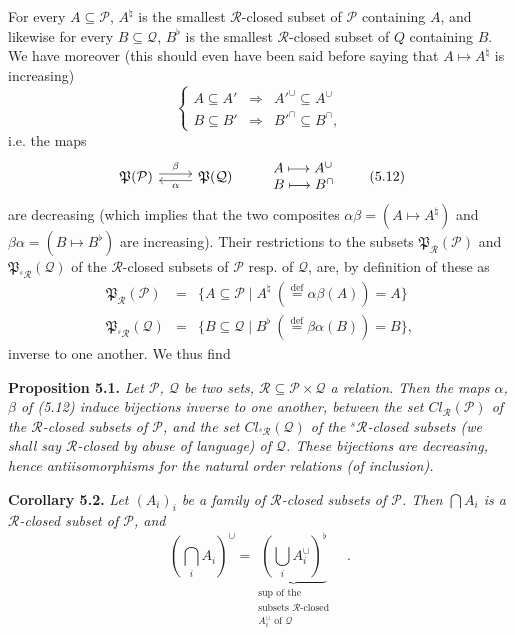 \documentclass[11pt]{article}
\newcommand{\msp}[1]{\marginpar{\footnotesize [#1]}}
\newcommand{\cP}{\mathcal{P}}
\newcommand{\cQ}{\mathcal{Q}}
\newcommand{\cR}{\mathcal{R}}
\newcommand{\fP}{\mathfrak{P}}
\newcommand{\sR}{{}^{s}\mathcal{R}}
\begin{document}
For every $A \subseteq \cP$, $A^{\natural}$ is the smallest $\cR$-closed subset of $\cP$ containing $A$, and likewise for every $B \subseteq \cQ$, $B^{\flat}$ is the smallest $\cR$-closed subset of $Q$ containing $B$. We have moreover (this should even have been said before saying that $A \longmapsto A^{\natural}$ is increasing) %
\[
\left\{
\begin{array}{rcl}
A \subseteq A' & \Longrightarrow & A'^{\cup} \subseteq A^{\cup}\\[1ex]
B \subseteq B' & \Longrightarrow & B'^{\cap} \subseteq B^{\cap},
\end{array}
\right.
\tag*{(5.11)}
\]
i.e. the maps
\[
\begin{tikzcd}
\fP(\cP) \arrow[r, shift left, "\beta"] & \fP(\cQ) \arrow[l, shift left, "\alpha"]
\end{tikzcd}
\qquad
\begin{array}{l}
A \longmapsto A^{\cup}\\
B \longmapsto B^{\cap}
\end{array}
\tag*{(5.12)}
\]
are decreasing (which implies that the two composites $\alpha\beta = (A \longmapsto A^{\natural})$ and $\beta\alpha = (B \longmapsto B^{\flat})$ are increasing). Their restrictions to the subsets $\fP_{\cR}(\cP)$ and $\fP_{\sR}(\cQ)$ of the $\cR$-closed subsets of $\cP$ resp. of $\cQ$, are, by definition of these as
\[
\begin{array}{rcl}
\fP_{\cR}(\cP) & = & \{A \subseteq \cP \mid A^{\natural} \ (\overset{\text{def}}{=} \alpha\beta(A)) = A\}\\
\fP_{\sR}(\cQ) & = & \{B \subseteq \cQ \mid B^{\flat} \ (\overset{\text{def}}{=} \beta\alpha(B)) = B\},
\end{array}
\]
inverse to one another. We thus find

\textbf{Proposition 5.1.} \textit{Let $\cP$, $\cQ$ be two sets, $\cR \subseteq \cP \times \cQ$ a relation. Then the maps $\alpha$, $\beta$ of (5.12) induce bijections inverse to one}
\msp{73}
\textit{another, between the set $\mathit{Cl}_{\cR}(\cP)$ of the $\cR$-closed subsets of $\cP$, and the set $\mathit{Cl}_{\sR}(\cQ)$ of the ${}^{s}\cR$-closed subsets (we shall say $\cR$-closed by abuse of language) of $\cQ$. These bijections are decreasing, hence antiisomorphisms for the natural order relations (of inclusion).}

\textbf{Corollary 5.2.} \textit{Let $(A_i)_i$ be a family of $\cR$-closed subsets of $\cP$. Then $\bigcap A_i$ is a $\cR$-closed subset of $\cP$, and}
\[
(\bigcap_i A_i)^{\cup} = \underbrace{(\bigcup_i A_i^{\cup})^{\flat}}_{\substack{\text{sup of the}\\ \text{subsets } \cR\text{-closed}\\ A_i^{\cup} \text{ of } \cQ}} \quad .
\tag*{(5.2.1)}
\]
\end{document}
